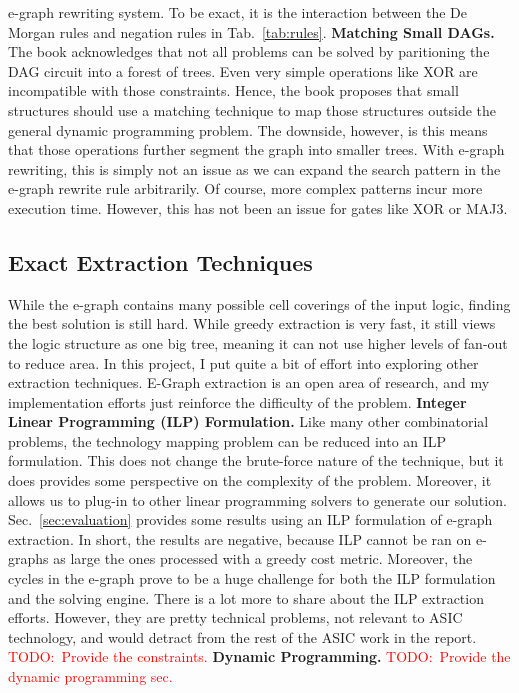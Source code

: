 \documentclass[10pt,letterpaper]{article}
\newcommand{\todo}[1]{\textcolor{red}{TODO:\ #1}}
\begin{document}
e-graph rewriting system. To be exact, it is the interaction between the De
Morgan rules and negation rules in Tab.~\ref{tab:rules}. \bigbreak{} \noindent
\textbf{Matching Small DAGs.} The book acknowledges that not all problems can
be solved by paritioning the DAG circuit into a forest of trees. Even very
simple operations like XOR are incompatible with those constraints. Hence, the
book proposes that small structures should use a matching technique to map
those structures outside the general dynamic programming problem. The downside,
however, is this means that those operations further segment the graph into
smaller trees. With e-graph rewriting, this is simply not an issue as we can
expand the search pattern in the e-graph rewrite rule arbitrarily. Of course,
more complex patterns incur more execution time. However, this has not been an
issue for gates like XOR or MAJ3.

\subsection{Exact Extraction Techniques}\label{sec:alt:extraction}

While the e-graph contains many possible cell coverings of the input logic,
finding the best solution is still hard. While greedy extraction is very fast,
it still views the logic structure as one big tree, meaning it can not use
higher levels of fan-out to reduce area. In this project, I put quite a bit of
effort into exploring other extraction techniques. E-Graph extraction is an
open area of research, and my implementation efforts just reinforce the
difficulty of the problem. \bigbreak{} \noindent \textbf{Integer Linear
    Programming (ILP) Formulation.} Like many other combinatorial problems, the
technology mapping problem can be reduced into an ILP formulation. This does
not change the brute-force nature of the technique, but it does provides some
perspective on the complexity of the problem. Moreover, it allows us to plug-in
to other linear programming solvers to generate our solution.
Sec.~\ref{sec:evaluation} provides some results using an ILP formulation of
e-graph extraction. In short, the results are negative, because ILP cannot be
ran on e-graphs as large the ones processed with a greedy cost metric.
Moreover, the cycles in the e-graph prove to be a huge challenge for both the
ILP formulation and the solving engine. There is a lot more to share about the
ILP extraction efforts. However, they are pretty technical problems, not
relevant to ASIC technology, and would detract from the rest of the ASIC work
in the report. \todo{Provide the constraints.} \bigbreak{} \noindent
\textbf{Dynamic Programming.} \todo{Provide the dynamic programming sec.}
\end{document}
